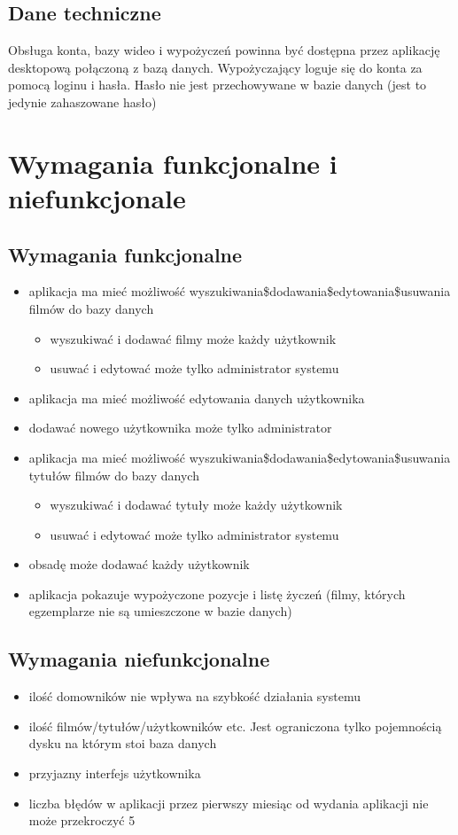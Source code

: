\documentclass{article}
\begin{document}
	\subsection{Dane techniczne}
		 Obsługa konta, bazy wideo i wypożyczeń powinna być dostępna przez aplikację desktopową połączoną z bazą danych.
		Wypożyczający loguje się do konta za pomocą loginu i hasła. Hasło nie jest przechowywane w bazie danych (jest to jedynie zahaszowane hasło)
	
	\section{Wymagania funkcjonalne i niefunkcjonale}
	\subsection{Wymagania funkcjonalne}
	\begin{itemize}
	\item aplikacja ma mieć możliwość wyszukiwania\$dodawania\$edytowania\$usuwania filmów do bazy danych
	\begin{itemize}
		\item wyszukiwać i dodawać filmy może każdy użytkownik
		\item usuwać i edytować może tylko administrator systemu
	\end{itemize}
	\item aplikacja ma mieć możliwość edytowania danych użytkownika
	\item  dodawać nowego użytkownika może tylko administrator
	\item aplikacja ma mieć możliwość wyszukiwania\$dodawania\$edytowania\$usuwania tytułów filmów do bazy danych 
	\begin{itemize}
		\item wyszukiwać i dodawać tytuły może każdy użytkownik
		\item usuwać i edytować może tylko administrator systemu
	\end{itemize}
	\item obsadę może dodawać każdy użytkownik
	\item aplikacja pokazuje wypożyczone pozycje i listę życzeń (filmy, których egzemplarze nie są umieszczone w bazie danych)
	\end{itemize}
	\subsection{Wymagania niefunkcjonalne}	
	\begin{itemize}
		\item ilość domowników nie wpływa na szybkość działania systemu
		\item ilość filmów/tytułów/użytkowników etc. Jest ograniczona tylko pojemnością dysku na którym stoi baza danych
		\item przyjazny interfejs użytkownika
		\item liczba błędów w aplikacji przez pierwszy miesiąc od wydania aplikacji nie może przekroczyć 5		
	\end{itemize}
\newpage
\end{document}
